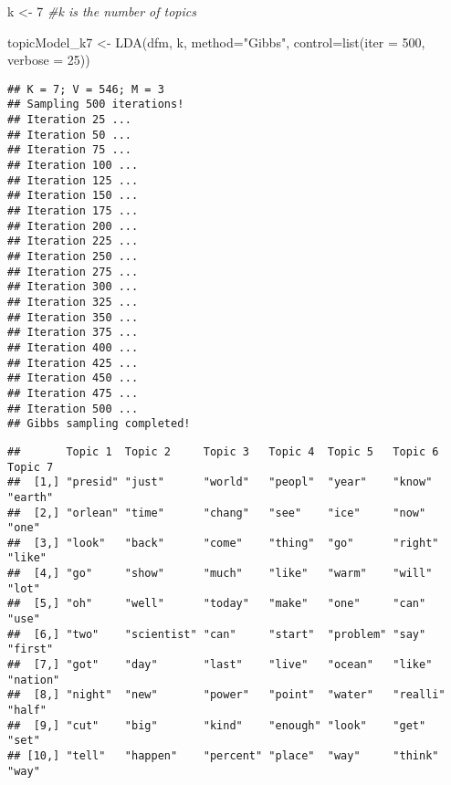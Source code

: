 \documentclass[
]{article}
\newenvironment{Shaded}{\begin{snugshade}}{\end{snugshade}}
\newcommand{\AttributeTok}[1]{\textcolor[rgb]{0.77,0.63,0.00}{#1}}
\newcommand{\CommentTok}[1]{\textcolor[rgb]{0.56,0.35,0.01}{\textit{#1}}}
\newcommand{\DecValTok}[1]{\textcolor[rgb]{0.00,0.00,0.81}{#1}}
\newcommand{\FunctionTok}[1]{\textcolor[rgb]{0.00,0.00,0.00}{#1}}
\newcommand{\NormalTok}[1]{#1}
\newcommand{\OtherTok}[1]{\textcolor[rgb]{0.56,0.35,0.01}{#1}}
\newcommand{\SpecialCharTok}[1]{\textcolor[rgb]{0.00,0.00,0.00}{#1}}
\newcommand{\StringTok}[1]{\textcolor[rgb]{0.31,0.60,0.02}{#1}}
\begin{document}
\begin{Shaded}
\begin{Highlighting}[]
\NormalTok{k }\OtherTok{\textless{}{-}} \DecValTok{7} \CommentTok{\#k is the number of topics}

\NormalTok{topicModel\_k7 }\OtherTok{\textless{}{-}} \FunctionTok{LDA}\NormalTok{(dfm, }
\NormalTok{                     k, }
                     \AttributeTok{method=}\StringTok{"Gibbs"}\NormalTok{, }
                     \AttributeTok{control=}\FunctionTok{list}\NormalTok{(}\AttributeTok{iter =} \DecValTok{500}\NormalTok{, }\AttributeTok{verbose =} \DecValTok{25}\NormalTok{))}
\end{Highlighting}
\end{Shaded}

\begin{verbatim}
## K = 7; V = 546; M = 3
## Sampling 500 iterations!
## Iteration 25 ...
## Iteration 50 ...
## Iteration 75 ...
## Iteration 100 ...
## Iteration 125 ...
## Iteration 150 ...
## Iteration 175 ...
## Iteration 200 ...
## Iteration 225 ...
## Iteration 250 ...
## Iteration 275 ...
## Iteration 300 ...
## Iteration 325 ...
## Iteration 350 ...
## Iteration 375 ...
## Iteration 400 ...
## Iteration 425 ...
## Iteration 450 ...
## Iteration 475 ...
## Iteration 500 ...
## Gibbs sampling completed!
\end{verbatim}

\begin{Shaded}
\end{Shaded}

\begin{verbatim}
##       Topic 1  Topic 2     Topic 3   Topic 4  Topic 5   Topic 6  Topic 7 
##  [1,] "presid" "just"      "world"   "peopl"  "year"    "know"   "earth" 
##  [2,] "orlean" "time"      "chang"   "see"    "ice"     "now"    "one"   
##  [3,] "look"   "back"      "come"    "thing"  "go"      "right"  "like"  
##  [4,] "go"     "show"      "much"    "like"   "warm"    "will"   "lot"   
##  [5,] "oh"     "well"      "today"   "make"   "one"     "can"    "use"   
##  [6,] "two"    "scientist" "can"     "start"  "problem" "say"    "first" 
##  [7,] "got"    "day"       "last"    "live"   "ocean"   "like"   "nation"
##  [8,] "night"  "new"       "power"   "point"  "water"   "realli" "half"  
##  [9,] "cut"    "big"       "kind"    "enough" "look"    "get"    "set"   
## [10,] "tell"   "happen"    "percent" "place"  "way"     "think"  "way"
\end{verbatim}
\end{document}
